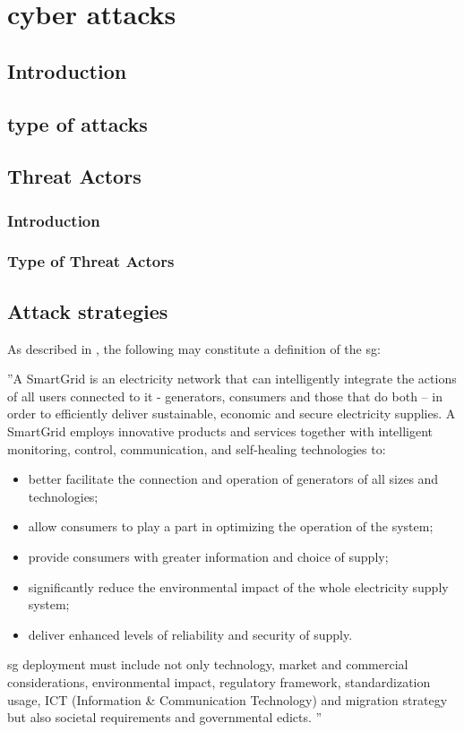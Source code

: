 \section{cyber attacks}
\subsection{Introduction}
\subsection{type of attacks}
\subsection{Threat Actors}
\subsubsection{Introduction}
\subsubsection{Type of Threat Actors}
\subsection{Attack strategies}












As described in \cite{gopstein2021nist}, the following may constitute a definition of the \acrlong{sg}:

\begin{displayquote}
''A SmartGrid is an electricity network that can intelligently integrate the actions of all
users connected to it - generators, consumers and those that do both – in order to
efficiently deliver sustainable, economic and secure electricity supplies.
A SmartGrid employs innovative products and services together with intelligent monitoring,
control, communication, and self-healing technologies to:
\begin{itemize}
\item better facilitate the connection and operation of generators of all sizes and technologies;
\item allow consumers to play a part in optimizing the operation of the system;
\item provide consumers with greater information and choice of supply;
\item significantly reduce the environmental impact of the whole electricity supply system;
\item deliver enhanced levels of reliability and security of supply.
\end{itemize}
\acrshort{sg} deployment must include not only technology, market and commercial
considerations, environmental impact, regulatory framework, standardization usage, ICT
(Information \& Communication Technology) and migration strategy but also societal
requirements and governmental edicts. 
'' 
\end{displayquote}


